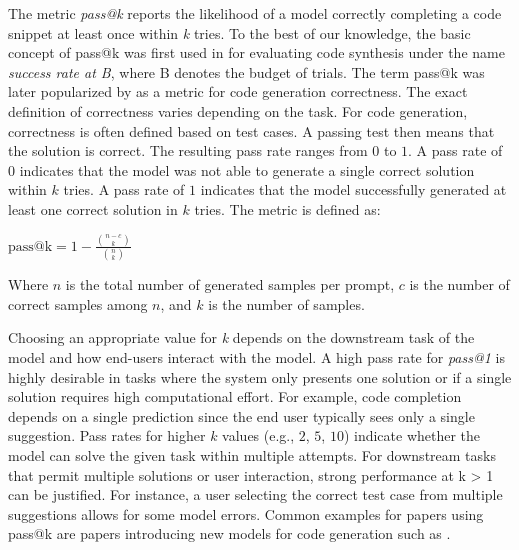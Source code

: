 The metric \emph{pass@k} reports the likelihood of a model correctly completing a code snippet at least once within \emph{k} tries.
To the best of our knowledge, the basic concept of pass@k was first used in \cite{DBLP:journals/corr/abs-1906-04908} for evaluating code synthesis under the name \emph{success rate at B}, where B denotes the budget of trials.
The term pass@k was later popularized by \cite{DBLP:journals/corr/abs-2107-03374} as a metric for code generation correctness.
The exact definition of correctness varies depending on the task.
For code generation, correctness is often defined based on test cases. A passing test then means that the solution is correct.
The resulting pass rate ranges from $0$ to $1$.
A pass rate of $0$ indicates that the model was not able to generate a single correct solution within $k$ tries.
A pass rate of $1$ indicates that the model successfully generated at least one correct solution in $k$ tries.
The metric is defined as:

$\text{pass@k} = 1 - \frac{\binom{n-c}{k}}{\binom{n}{k}}$

Where $n$ is the total number of generated samples per prompt, $c$ is the number of correct samples among  $n$, and $k$ is the number of samples.

Choosing an appropriate value for \emph{k} depends on the downstream task of the model and how end-users interact with the model.
A high pass rate for \emph{pass@1} is highly desirable in tasks where the system only presents one solution or if a single solution requires high computational effort.
For example, code completion depends on a single prediction since the end user typically sees only a single suggestion.
Pass rates for higher $k$ values (e.g., $2$, $5$, $10$) indicate whether the model can solve the given task within multiple attempts.
For downstream tasks that permit multiple solutions or user interaction, strong performance at k > 1 can be justified. 
For instance, a user selecting the correct test case from multiple suggestions allows for some model errors.
Common examples for papers using pass@k are papers introducing new models for code generation such as \cite{DBLP:journals/corr/abs-2308-12950, DBLP:journals/corr/abs-2401-14196, DBLP:journals/corr/abs-2409-12186, DBLP:journals/corr/abs-2305-06161}.

